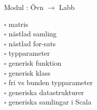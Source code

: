 
    Modul : Övn  $\rightarrow$ Labb 
    \begin{multicols}{3}\SlideFontTiny
    $\square$ matris \\
$\square$ nästlad samling \\
$\square$ nästlad for-sats \\
$\square$ typparameter \\
$\square$ generisk funktion \\
$\square$ generisk klass \\
$\square$ fri vs bunden typparameter \\
$\square$ generiska datastrukturer \\
$\square$ generiska samlingar i Scala \\
    \end{multicols}
    